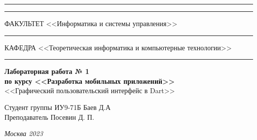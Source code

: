 \documentclass[a4paper, 14pt]{extarticle}
\begin{document}
\begin{titlepage}
\vspace{-25pt}
\hspace{-35pt}\rule{\textwidth}{2.3pt}

\vspace*{-20.3pt}
\hspace{-35pt}\rule{\textwidth}{0.4pt}

\vspace{1.5ex}
\hspace{-35pt} \noindent \small ФАКУЛЬТЕТ\hspace{80pt} <<Информатика и системы управления>>

\vspace*{-16pt}
\hspace{47pt}\rule{0.83\textwidth}{0.4pt}

\vspace{0.5ex}
\hspace{-35pt} \noindent \small КАФЕДРА\hspace{50pt} <<Теоретическая информатика и компьютерные технологии>>

\vspace*{-16pt}
\hspace{30pt}\rule{0.866\textwidth}{0.4pt}
  
\vspace{11em}

\begin{center}
\Large {\bf Лабораторная работа № 1} \\ 
\large {\bf по курсу <<Разработка мобильных приложений>>} \\
\large <<Графический пользовательский интерфейс в Dart>> 
\end{center}\normalsize

\vspace{8em}


\begin{flushright}
  {Студент группы ИУ9-71Б Баев Д.А \hspace*{15pt}\\ 
  \vspace{2ex}
  Преподаватель Посевин Д. П.\hspace*{15pt}}
\end{flushright}

\bigskip

\vfill
 

\begin{center}
\textsl{Москва 2023}
\end{center}
\end{titlepage}
\end{document}
